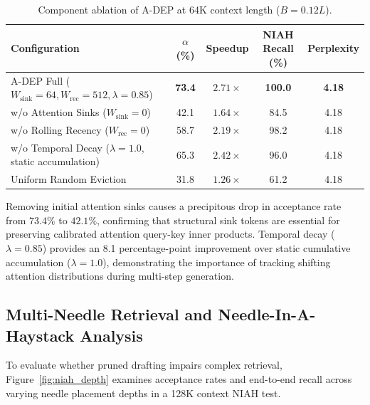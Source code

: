 \documentclass[runningheads]{llncs}
\begin{document}
\begin{table}[t]
\centering
\caption{Component ablation of A-DEP at 64K context length ($B = 0.12L$).}
\label{tab:ablation_components}
\small
\begin{tabular}{lcccc}
\toprule
\textbf{Configuration} & \textbf{$\alpha$ (\%)} & \textbf{Speedup} & \textbf{NIAH Recall (\%)} & \textbf{Perplexity} \\
\midrule
A-DEP Full ($W_{\text{sink}}=64, W_{\text{rec}}=512, \lambda=0.85$) & \textbf{73.4} & $\mathbf{2.71\times}$ & \textbf{100.0} & \textbf{4.18} \\
w/o Attention Sinks ($W_{\text{sink}}=0$) & 42.1 & $1.64\times$ & 84.5 & 4.18 \\
w/o Rolling Recency ($W_{\text{rec}}=0$) & 58.7 & $2.19\times$ & 98.2 & 4.18 \\
w/o Temporal Decay ($\lambda = 1.0$, static accumulation) & 65.3 & $2.42\times$ & 96.0 & 4.18 \\
Uniform Random Eviction & 31.8 & $1.26\times$ & 61.2 & 4.18 \\
\bottomrule
\end{tabular}
\end{table}

Removing initial attention sinks causes a precipitous drop in acceptance rate from $73.4\%$ to $42.1\%$, confirming that structural sink tokens are essential for preserving calibrated attention query-key inner products. Temporal decay ($\lambda = 0.85$) provides an 8.1 percentage-point improvement over static cumulative accumulation ($\lambda = 1.0$), demonstrating the importance of tracking shifting attention distributions during multi-step generation.

\subsection{Multi-Needle Retrieval and Needle-In-A-Haystack Analysis}
To evaluate whether pruned drafting impairs complex retrieval, Figure~\ref{fig:niah_depth} examines acceptance rates and end-to-end recall across varying needle placement depths in a 128K context NIAH test.
\end{document}

